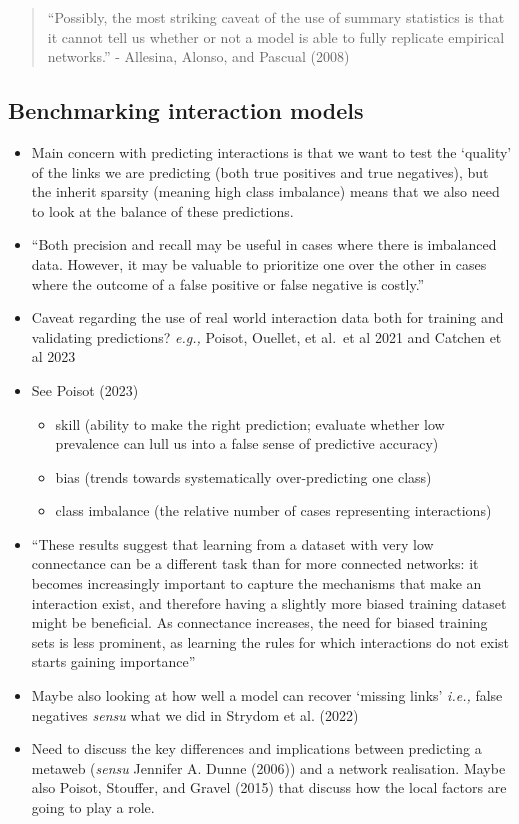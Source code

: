 \documentclass[
  letterpaper,
  DIV=11,
  numbers=noendperiod]{scrartcl}
\begin{document}
\begin{quote}
``Possibly, the most striking caveat of the use of summary statistics is
that it cannot tell us whether or not a model is able to fully replicate
empirical networks.'' - Allesina, Alonso, and Pascual (2008)
\end{quote}

\subsection{Benchmarking interaction
models}\label{benchmarking-interaction-models}

\begin{itemize}
\item
  Main concern with predicting interactions is that we want to test the
  `quality' of the links we are predicting (both true positives and true
  negatives), but the inherit sparsity (meaning high class imbalance)
  means that we also need to look at the balance of these predictions.
\item
  ``Both precision and recall may be useful in cases where there is
  imbalanced data. However, it may be valuable to prioritize one over
  the other in cases where the outcome of a false positive or false
  negative is costly.''
\item
  Caveat regarding the use of real world interaction data both for
  training and validating predictions? \emph{e.g.,} Poisot, Ouellet, et
  al.~et al 2021 and Catchen et al 2023
\item
  See Poisot (2023)

  \begin{itemize}
  \item
    skill (ability to make the right prediction; evaluate whether low
    prevalence can lull us into a false sense of predictive accuracy)
  \item
    bias (trends towards systematically over-predicting one class)
  \item
    class imbalance (the relative number of cases representing
    interactions)
  \end{itemize}
\item
  ``These results suggest that learning from a dataset with very low
  connectance can be a different task than for more connected networks:
  it becomes increasingly important to capture the mechanisms that make
  an interaction exist, and therefore having a slightly more biased
  training dataset might be beneficial. As connectance increases, the
  need for biased training sets is less prominent, as learning the rules
  for which interactions do not exist starts gaining importance''
\item
  Maybe also looking at how well a model can recover `missing links'
  \emph{i.e.,} false negatives \emph{sensu} what we did in Strydom et
  al. (2022)
\item
  Need to discuss the key differences and implications between
  predicting a metaweb (\emph{sensu} Jennifer A. Dunne (2006)) and a
  network realisation. Maybe also Poisot, Stouffer, and Gravel (2015)
  that discuss how the local factors are going to play a role.
\end{itemize}
\end{document}
